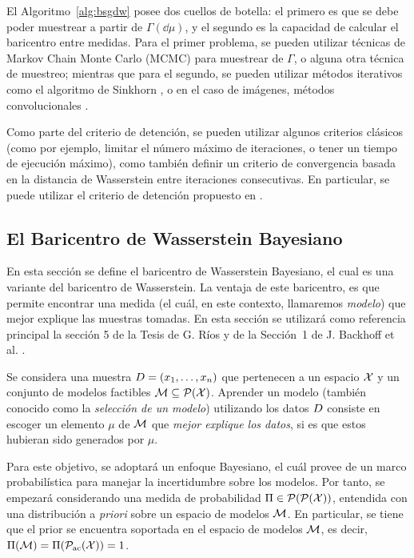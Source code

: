 El Algoritmo~\ref{alg:bsgdw} posee dos cuellos de botella: el primero es que se debe poder muestrear a partir de $\Gamma(\dd \mu)$, y el segundo es la capacidad de calcular el baricentro entre medidas. Para el primer problema, se pueden utilizar técnicas de Markov Chain Monte Carlo (MCMC) \cite{andrieu2003introduction,brooks2011handbook,goodman2010ensemble} para muestrear de $\Gamma$, o alguna otra técnica de muestreo; mientras que para el segundo, se pueden utilizar métodos iterativos como el algoritmo de Sinkhorn \cite{cuturi2013sinkhorn}, o en el caso de imágenes, métodos convolucionales \cite{solomon2015convolutional,janati2020debiased}.

Como parte del criterio de detención, se pueden utilizar algunos criterios clásicos (como por ejemplo, limitar el número máximo de iteraciones, o tener un tiempo de ejecución máximo), como también definir un criterio de convergencia basada en la distancia de Wasserstein entre iteraciones consecutivas. En particular, se puede utilizar el criterio de detención propuesto en \cite{backhoff2022bayesian}.



\subsection{El Baricentro de Wasserstein Bayesiano}\label{ssec:baricentro-Wasserstein-Bayesiano}  %

En esta sección se define el baricentro de Wasserstein Bayesiano, el cual es una variante del baricentro de Wasserstein. La ventaja de este baricentro, es que permite encontrar una medida (el cuál, en este contexto, llamaremos \emph{modelo}) que mejor explique las muestras tomadas.
En esta sección se utilizará como referencia principal la sección 5 de la Tesis de G. Ríos \cite{rios2020contributions} y de la Sección~1 de J. Backhoff et al. \cite{backhoff2022bayesian}.

Se considera una muestra $\Data = \left(x_1,\ldots, x_n \right)$ que pertenecen a un espacio $\cX$ y un conjunto de modelos factibles
$\Models \subseteq \ProbSpace[\cX]$. Aprender un modelo (también conocido como la \emph{selección de un modelo}) utilizando los datos $\Data$  consiste en escoger un elemento $\mu$ de $\Models$ que \emph{mejor explique los datos}, si es que estos hubieran sido generados por $\mu$.

Para este objetivo, se adoptará un enfoque Bayesiano, el cuál provee de un marco probabilística para manejar la incertidumbre sobre los modelos. Por tanto, se empezará considerando una medida de probabilidad $\Pi \in \ProbSpace[\ProbSpace[\cX] ] $, entendida con una distribución a \textit{priori} sobre un espacio de modelos $\Models$. En particular, se tiene que el prior se encuentra soportada en el espacio de modelos $\Models$, es decir, $\Pi(\Models) = \Pi(\ProbSpaceAC[\cX] ) = 1$.


